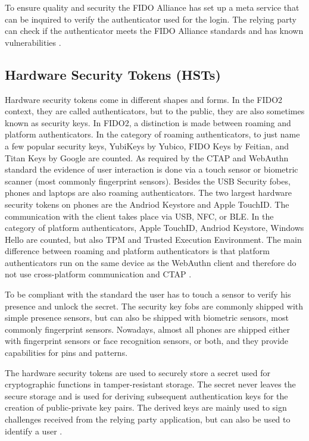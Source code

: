 \documentclass[runningheads]{llncs}
\begin{document}
To ensure quality and security the FIDO Alliance has set up a meta service that can be inquired to verify the authenticator used for the login. The relying party can check if the authenticator meets the FIDO Alliance standards and has known vulnerabilities \cite{9099190}.

\subsection{Hardware Security Tokens (HSTs)}
Hardware security tokens come in different shapes and forms. In the FIDO2 context, they are called authenticators, but to the public, they are also sometimes known as security keys. In FIDO2, a distinction is made between roaming and platform authenticators. In the category of roaming authenticators, to just name a few popular security keys, YubiKeys by Yubico, FIDO Keys by Feitian, and Titan Keys by Google are counted. As required by the CTAP and WebAuthn standard the evidence of user interaction is done via a touch sensor or biometric scanner (most commonly fingerprint sensors). Besides the USB Security fobes, phones and laptops are also roaming authenticators. The two largest hardware security tokens on phones are the Andriod Keystore and Apple TouchID. The communication with the client takes place via USB, NFC, or BLE.
In the category of platform authenticators, Apple TouchID, Andriod Keystore, Windows Hello are counted, but also TPM and Trusted Execution Environment. The main difference between roaming and platform authenticators is that platform authenticators run on the same device as the WebAuthn client and therefore do not use cross-platform communication and CTAP \cite{9152694}. 

To be compliant with the standard the user has to touch a sensor to verify his presence and unlock the secret. The security key fobs are commonly shipped with simple presence sensors, but can also be shipped with biometric sensors, most commonly fingerprint sensors. Nowadays, almost all phones are shipped either with fingerprint sensors or face recognition sensors, or both, and they provide capabilities for pins and patterns.

The hardware security tokens are used to securely store a secret used for cryptographic functions in tamper-resistant storage. The secret never leaves the secure storage and is used for deriving subsequent authentication keys for the creation of public-private key pairs. The derived keys are mainly used to sign challenges received from the relying party application, but can also be used to identify a user \cite{272198}.
\end{document}
